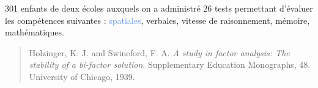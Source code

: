 





301 enfants de deux écoles auxquels on a administré 26 tests permettant d'évaluer les compétences suivantes : \textcolor{CornflowerBlue}{spatiales}, verbales, vitesse de raisonnement, mémoire, mathématiques.

\begin{quote}
  Holzinger, K. J. and Swineford, F. A. \emph{A study in factor analysis: The stability
  of a bi-factor solution}. Supplementary Education Monographs, 48. University of
  Chicago, 1939.  
\end{quote}


{\centering {}\par}


